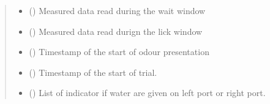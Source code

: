 \documentclass[letterpaper,10pt,english]{sphinxmanual}
\begin{document}
\begin{fulllineitems}
\begin{fulllineitems}
\begin{quote}
\begin{description}
\begin{itemize}
\item {} 
\sphinxAtStartPar
{} () \textendash{} Measured data read during the wait window

\item {} 
\sphinxAtStartPar
{} () \textendash{} Measured data read durign the lick window

\item {} 
\sphinxAtStartPar
{} () \textendash{} Timestamp of the start of odour presentation

\item {} 
\sphinxAtStartPar
{} () \textendash{} Timestamp of the start of trial.

\item {} 
\sphinxAtStartPar
{} () \textendash{} List of indicator if water are given on left port or right port.

\end{itemize}


\end{description}\end{quote}

\end{fulllineitems}


\end{fulllineitems}

\end{document}
